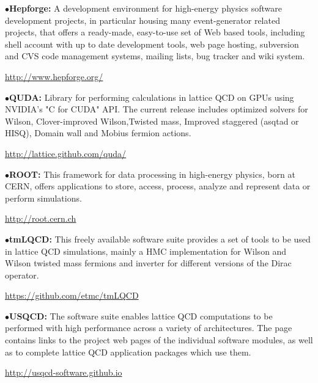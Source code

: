\medskip

\item{$\bullet$}{\bf Hepforge:}
A development environment for high-energy physics software development projects, in particular housing many event-generator related projects, that offers a ready-made, easy-to-use set of Web based tools, including shell account with up to date development tools, web page hosting, subversion and CVS code management systems, mailing lists, bug tracker and wiki system.
	\item{}\qquad\url{http://www.hepforge.org/}

\medskip

\item{$\bullet$}{\bf QUDA:} 
Library for performing calculations in lattice QCD on GPUs using NVIDIA's "C for CUDA" API. The current release includes optimized solvers for Wilson, Clover-improved Wilson,Twisted mass, Improved staggered (asqtad or HISQ), Domain wall and Mobius fermion actions.
	\item{}\qquad\url{http://lattice.github.com/quda/}

\medskip

\item{$\bullet$}{\bf ROOT:}
This framework for data processing in high-energy physics, born at CERN, offers applications to store, access, process, analyze and represent data or perform simulations.
	\item{}\qquad\url{http://root.cern.ch}

\medskip

\item{$\bullet$}{\bf tmLQCD:} 
This freely available software suite provides a set of tools to be used in lattice QCD simulations, mainly a HMC implementation for Wilson and Wilson twisted mass fermions and inverter for different versions of the Dirac operator.
	\item{}\qquad\url{https://github.com/etmc/tmLQCD}

\medskip

\item{$\bullet$}{\bf USQCD:} 
The software suite enables lattice QCD computations to be performed with high performance across a variety of architectures. The page contains links to the project web pages of the individual software modules, as well as to complete lattice QCD application packages which use them.
	\item{}\qquad\url{http://usqcd-software.github.io}

\medskip

